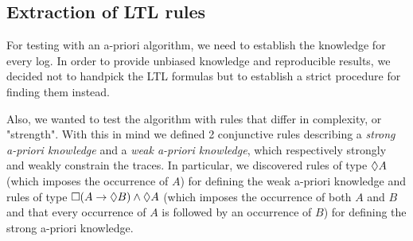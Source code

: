 \subsection{Extraction of LTL rules} \label{extractionLTLrules}

For testing with an a-priori algorithm, we need to establish the knowledge for every log. In order to provide unbiased knowledge and reproducible results, we decided not to handpick the LTL formulas but to establish a strict procedure for finding them instead.

Also, we wanted to test the algorithm with rules that differ in complexity, or "strength". With this in mind we defined 2 conjunctive rules describing a \textit{strong a-priori knowledge} and a \textit{weak a-priori knowledge}, which respectively strongly and weakly constrain the traces. In particular, we discovered rules of type $\lozenge A$ (which imposes the occurrence of $A$) for defining the weak a-priori knowledge and rules of type $\square(A \rightarrow \lozenge B) \wedge \lozenge A$ (which imposes the occurrence of both $A$ and $B$ and that every occurrence of $A$ is followed by an occurrence of $B$) for defining the strong a-priori knowledge.

